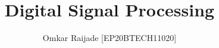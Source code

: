 \documentclass[journal,12pt,twocolumn]{IEEEtran}
\begin{document}
	\makeatother
	\let\StandardTheFigure\thefigure
	\renewcommand{\thefigure}{\theproblem}
	\def\putbox#1#2#3{\makebox[0in][l]{\makebox[#1][l]{}\raisebox{\baselineskip}[0in][0in]{\raisebox{#2}[0in][0in]{#3}}}}
	\def\rightbox#1{\makebox[0in][r]{#1}}
	\def\centbox#1{\makebox[0in]{#1}}
	\def\topbox#1{\raisebox{-\baselineskip}[0in][0in]{#1}}
	\def\midbox#1{\raisebox{-0.5\baselineskip}[0in][0in]{#1}}
	\vspace{3cm}
	\title{ 
			Digital Signal Processing
	}
	\author{ Omkar Raijade [EP20BTECH11020]%
}
% 
%
\end{document}
